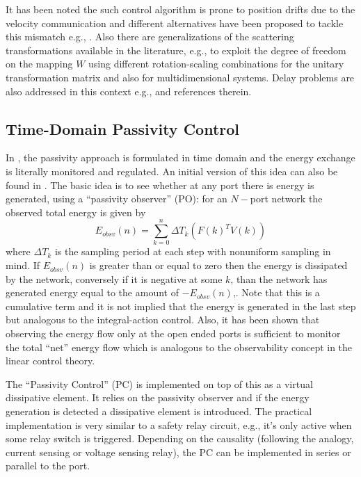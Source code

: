 It has been noted the such control algorithm is prone to position drifts due to the velocity communication and 
different alternatives have been proposed to tackle this mismatch e.g., \cite{yokokohji,chopratro06}. 
Also there are generalizations of the scattering 
transformations available in the literature, e.g., \cite{hirchebuss} to exploit the degree of freedom on the 
mapping $W$ using different rotation-scaling combinations for the unitary transformation matrix and also 
\cite{stramigioli} for multidimensional systems. Delay problems are also addressed in this context e.g., 
\cite{chopraberes,munirbook,nieslotine97,uedayoshikawa} and references therein. 



\subsection{Time-Domain Passivity Control}
In \cite{hannafordryu}, the passivity approach is formulated in time domain and the energy exchange is literally
monitored and regulated. An initial version of this idea can also be found in \cite{yokokohji}. The basic idea is 
to see whether at any port there is energy is generated, using a ``passivity observer'' (PO): for an $N-$port 
network the observed total energy is given by
\[
E_{obsv}(n) = \sum_{k=0}^n \Delta T_k(F(k)^TV(k))
\]
where $\Delta T_k$ is the sampling period at each step with nonuniform sampling in mind. If 
$E_{obsv}(n) $ is greater than or equal to zero then the energy is dissipated by the network, conversely if
it is negative at some $k$, than the network has generated energy equal to the amount of $-E_{obsv}(n)$,. Note that
this is a cumulative term and it is not implied that the energy is generated in the last step but analogous to the 
integral-action control. Also, it has been shown that observing the energy flow only at the open ended ports is 
sufficient to monitor the total ``net'' energy flow which is analogous to the observability concept in the 
linear control theory. 

The ``Passivity Control'' (PC) is implemented on top of this as a virtual dissipative element. It relies on the 
passivity observer and if the energy generation is detected a dissipative element is introduced. The practical 
implementation is very similar to a safety relay circuit, e.g., it's only active when some relay switch is 
triggered. Depending on the causality (following the analogy, current sensing or voltage sensing relay), the 
PC can be implemented in series or parallel to the port. 

